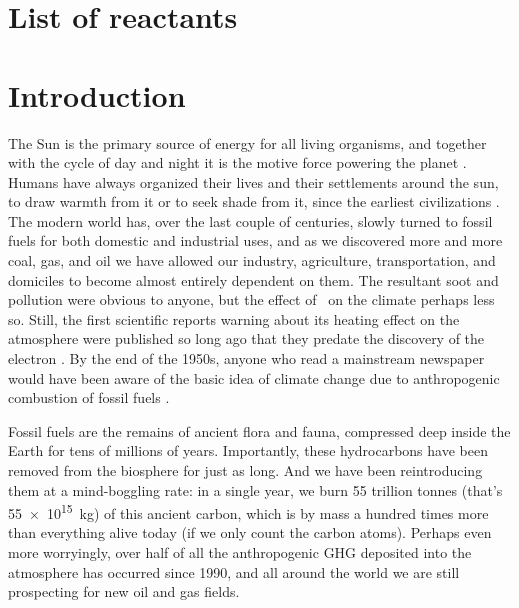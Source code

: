 \documentclass[webedition,openright,titles,swedish,english]{LuaUUThesis}\usepackage[]{graphicx}\usepackage[]{xcolor}
\begin{document}
\printunsrtglossary[%
   type=abbreviations,%
   style=list,%
   title={List of abbreviations},%
   preamble={}%
]



\clearpage
\newcommand{\listofreactantsname}{List of reactants}
\chapter*{\listofreactantsname}
\addcontentsline{toc}{chapter}{\listofreactantsname}
\ifdraft{\printreactants*}{\printreactants}



\mainmatter


\chapter{Introduction}
\label{ch:introduction}

The Sun is the primary source of energy for all living organisms,
and together with the cycle of day and night it is
the motive force powering the planet \cite{Schneider2005}.
Humans have always organized their lives and their settlements around the sun,
to draw warmth from it or to seek shade from it, since the earliest civilizations
\cite{Perlin2013}.
The modern world has, over the last couple of centuries, slowly turned to fossil fuels
for both domestic and industrial uses, and as we discovered more and more coal, gas,
and oil we have allowed our industry, agriculture, transportation, and
domiciles to become almost entirely dependent on them.
The resultant soot and pollution were obvious to anyone, but the effect of
\carbondiox\ on the climate perhaps less so. Still, the first scientific
reports warning about its heating effect on the atmosphere were
published so long ago \cite{Arrhenius1896,Tyndall1861,Jackson2019}
that they predate the discovery of the electron \cite{Thomson1897}.
By the end of the 1950s, anyone who read a mainstream newspaper
would have been aware of the basic idea of climate change due to anthropogenic
combustion of fossil fuels \cite{Hudson2023}.

Fossil fuels are the remains of ancient flora and fauna, compressed deep inside the Earth
for tens of millions of years. Importantly, these hydrocarbons
have been removed from the biosphere for just as long.
And we have been reintroducing them at a mind-boggling rate:
in a single year, we burn \num{55} trillion tonnes (that's \qty{55e15}{\kg}) of
this ancient carbon, which is by mass a hundred times more than everything
alive today (if we only count the carbon atoms).
Perhaps even more worryingly, over half of all the anthropogenic \gls{GHG} deposited
into the atmosphere has occurred since 1990, and all around the world we are still
prospecting for new oil and gas fields.
\end{document}
